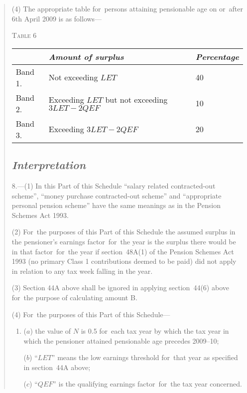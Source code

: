 \documentclass[12pt,a4paper]{article}
\begin{document}
\begin{quotation}
{}

(4) The appropriate table for~persons attaining pensionable age on or~after 6th April 2009 is as follows—

\noindent\textsc{Table 6}

{\noindent\footnotesize
\begin{longtable}{lll}
\hline
&\itshape Amount of surplus	&\itshape Percentage\\
\hline
\endhead
\hline
\endlastfoot
Band 1. 	&Not exceeding $LET$	&40\\
Band 2. 	&Exceeding $LET$ but not exceeding $3LET - 2QEF$	&10\\
Band 3. 	&Exceeding $3LET - 2QEF$	&20\\
\end{longtable}

}

\subsection*{\itshape Interpretation}

8.---(1) In this Part of this Schedule “salary related contracted-out scheme”, “money purchase contracted-out scheme” and “appropriate personal pension scheme” have the same meanings as in the Pension Schemes Act 1993. 

(2) For~the purposes of this Part of this Schedule the assumed surplus in the pensioner’s earnings factor~for~the year is the surplus there would be in that factor~for~the year if section~48A(1)  of the Pension Schemes Act 1993 (no primary Class 1 contributions deemed to be paid) did not apply in relation to any tax week falling in the year.

(3) Section 44A above shall be ignored in applying section~44(6)  above for~the purpose of calculating amount B.

(4) For~the purposes of this Part of this Schedule—
\begin{enumerate}\item[]
($a$) the value of $N$ is 0$.$5 for~each tax year by which the tax year in which the pensioner attained pensionable age precedes 2009--10;

($b$) “$LET$” means the low earnings threshold for~that year as specified in section~44A above;

($c$) “$QEF$” is the qualifying earnings factor~for~the tax year concerned.
\end{enumerate}


\end{quotation}
\end{document}
